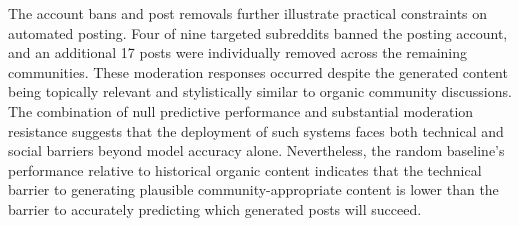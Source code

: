 The account bans and post removals further illustrate practical constraints on automated posting. Four of nine targeted subreddits banned the posting account, and an additional 17 posts were individually removed across the remaining communities. These moderation responses occurred despite the generated content being topically relevant and stylistically similar to organic community discussions. The combination of null predictive performance and substantial moderation resistance suggests that the deployment of such systems faces both technical and social barriers beyond model accuracy alone. Nevertheless, the random baseline's performance relative to historical organic content indicates that the technical barrier to generating plausible community-appropriate content is lower than the barrier to accurately predicting which generated posts will succeed.